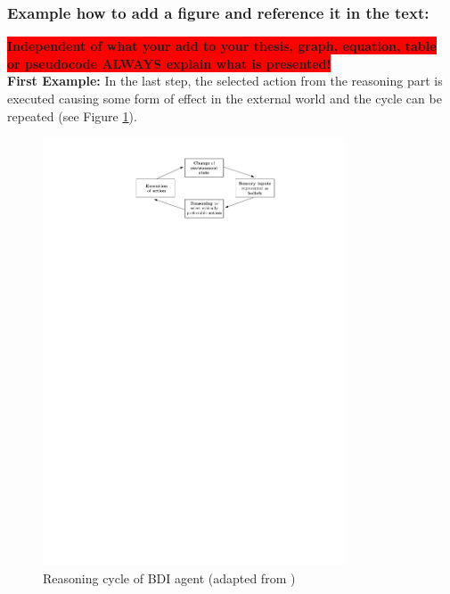  
\subsubsection{Example how to add a figure and reference it in the text:}

\colorbox{red}{\textbf{Independent of what your add to your thesis, graph, equation, table}}\\
\colorbox{red}{\textbf{or pseudocode ALWAYS explain what is presented!}}
\\
 
\textbf{First Example:}
In the last step, the selected action from the reasoning part is executed causing some form of effect in the external world and the cycle can be repeated (see Figure \ref{reasoning}).

\begin{figure}[H]
	\centering
  \includegraphics[width=0.8\textwidth]{figures/reason_cycl.pdf}
	\caption{Reasoning cycle of BDI agent (adapted from \cite{bremner2019})}
	\label{reasoning}
\end{figure}



